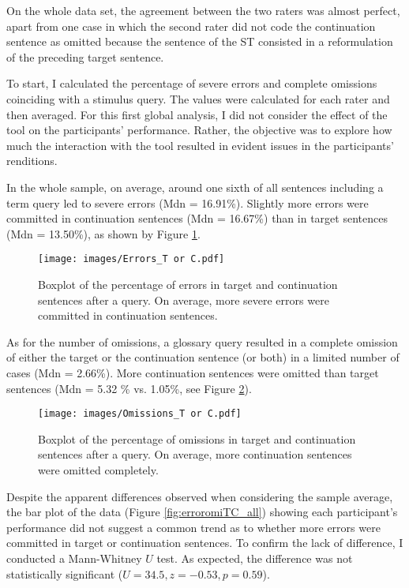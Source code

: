On the whole data set, the agreement between the two raters was almost perfect, apart from one case in which the second rater did not code the continuation sentence as omitted because the sentence of the ST consisted in a reformulation of the preceding target sentence.

 \label{globalanalysis}

To start, I calculated the percentage of severe errors and complete omissions coinciding with a stimulus query. The values were calculated for each rater and then averaged. For this first global analysis, I did not consider the effect of the tool on the participants' performance. Rather, the objective was to explore how much the interaction with the tool resulted in evident issues in the participants' renditions.

In the whole sample, on average, around one sixth of all sentences including a term query led to severe errors (Mdn = 16.91\%). Slightly more errors were committed in continuation sentences (Mdn = 16.67\%) than in target sentences (Mdn = 13.50\%), as shown by Figure \ref{fig:errors_TC}.

\begin{figure}
\texttt{[image: images/Errors\_T or C.pdf]}
\caption[Errors Target or Continuation]{Boxplot of the percentage of errors in target and continuation sentences after a query. On average, more severe errors were committed in continuation sentences.}
\label{fig:errors_TC}
\end{figure}

As for the number of omissions, a glossary query resulted in a complete omission of either the target or the continuation sentence (or both) in a limited number of cases (Mdn = 2.66\%). More continuation sentences were omitted than target sentences (Mdn = 5.32 \% vs. 1.05\%, see Figure \ref{fig:omissions_TC}).

\begin{figure}[H]\centering
\texttt{[image: images/Omissions\_T or C.pdf]}
\caption[Omissions Target or Continuation]{Boxplot of the percentage of omissions in target and continuation sentences after a query. On average, more continuation sentences were omitted completely.}
\label{fig:omissions_TC}
\end{figure}

Despite the apparent differences observed when considering the sample average, the bar plot of the data (Figure \ref{fig:erroromiTC_all}) showing each participant's performance did not suggest a common trend as to whether more errors were committed in target or continuation sentences. To confirm the lack of difference, I conducted a Mann-Whitney $U$ test. As expected, the difference was not statistically significant ($U = 34.5, z = -0.53, p = 0.59$).\largerpage

